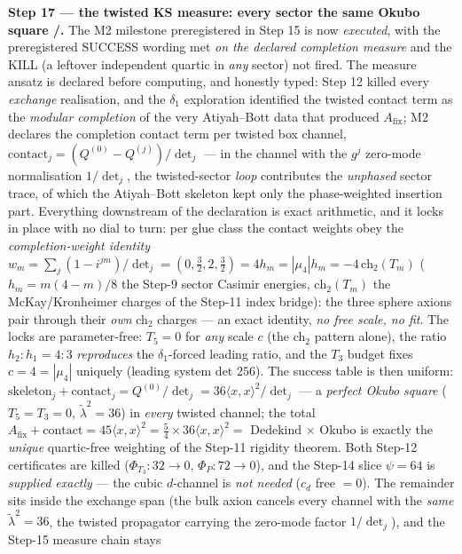 \par\smallskip\noindent\textbf{Step 17 --- the twisted KS measure: every sector the same Okubo
square \mE/\mC.} The M2 milestone preregistered in Step 15 is now \emph{executed}, with the
preregistered SUCCESS wording met \emph{on the declared completion measure} and the KILL (a
leftover independent quartic in \emph{any} sector) not fired. The measure ansatz is declared
before computing, and honestly typed: Step 12 killed every \emph{exchange} realisation, and the
$\delta_1$ exploration identified the twisted contact term as the \emph{modular completion} of
the very Atiyah--Bott data that produced $A_{\mathrm{fix}}$; M2 declares the completion contact
term per twisted box channel, $\mathrm{contact}_j=(Q^{(0)}-Q^{(j)})/\det_j$ --- in the channel
with the $g^j$ zero-mode normalisation $1/\det_j$, the twisted-sector \emph{loop} contributes
the \emph{unphased} sector trace, of which the Atiyah--Bott skeleton kept only the
phase-weighted insertion part. Everything downstream of the declaration is exact arithmetic,
and it locks in place with no dial to turn: per glue class the contact weights obey the
\emph{completion-weight identity}
$w_m=\sum_j(1-i^{jm})/\det_j=(0,\tfrac32,2,\tfrac32)=4h_m=|\mu_4|h_m=-4\,\mathrm{ch}_2(T_m)$
($h_m=m(4-m)/8$ the Step-9 sector Casimir energies, $\mathrm{ch}_2(T_m)$ the McKay/Kronheimer
charges of the Step-11 index bridge): the three sphere axions pair through their \emph{own}
ch$_2$ charges --- an exact identity, \emph{no free scale, no fit}. The locks are
parameter-free: $T_5=0$ for \emph{any} scale $c$ (the ch$_2$ pattern alone), the ratio
$h_2{:}h_1=4{:}3$ \emph{reproduces} the $\delta_1$-forced leading ratio, and the $T_3$ budget
fixes $c=4=|\mu_4|$ uniquely (leading system det $256$). The success table is then uniform:
$\mathrm{skeleton}_j+\mathrm{contact}_j=Q^{(0)}/\det_j=36\langle x,x\rangle^2/\det_j$ --- a
\emph{perfect Okubo square} ($T_5=T_3=0$, $\tilde\lambda^2=36$) in \emph{every} twisted channel;
the total $A_{\mathrm{fix}}+\mathrm{contact}=45\langle x,x\rangle^2=\tfrac54\times36\langle
x,x\rangle^2=$ Dedekind $\times$ Okubo is exactly the \emph{unique} quartic-free weighting of
the Step-11 rigidity theorem. Both Step-12 certificates are killed ($\Phi_{T_3}\!:32\to0$,
$\Phi_P\!:72\to0$), and the Step-14 slice $\psi=64$ is \emph{supplied exactly} --- the cubic
$d$-channel is \emph{not needed} ($c_d$ free $=0$). The remainder sits inside the exchange span
(the bulk axion cancels every channel with the \emph{same} $\tilde\lambda^2=36$, the twisted
propagator carrying the zero-mode factor $1/\det_j$), and the Step-15 measure chain stays
